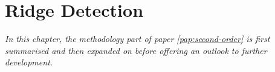 \chapter{Ridge Detection}
\label{chap:erm}

\textit{In this chapter, the methodology part of paper \ref{pap:second-order} is first summarised and then expanded on before offering an outlook to further development.}





